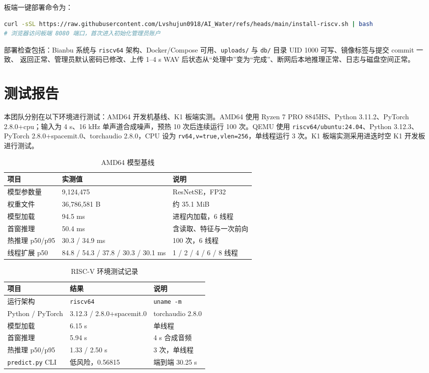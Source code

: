 \documentclass[lang=cn,11pt,scheme=chinese,chinesefont=nofont,color=green]{elegantbook}
\begin{document}
板端一键部署命令为：

\begin{lstlisting}[language=bash,caption={RISC-V 板端部署},label={lst:deploy}]
curl -sSL https://raw.githubusercontent.com/Lvshujun0918/AI_Water/refs/heads/main/install-riscv.sh | bash
# 浏览器访问板端 8080 端口，首次进入初始化管理员账户
\end{lstlisting}

部署检查包括：Bianbu 系统与 \texttt{riscv64} 架构、Docker/Compose 可用、\texttt{uploads/} 与 \texttt{db/} 目录 UID 1000 可写、镜像标签与提交 commit 一致、 返回正常、管理员默认密码已修改、上传 1--4 s WAV 后状态从“处理中”变为“完成”、断网后本地推理正常、日志与磁盘空间正常。

\section{测试报告}

本团队分别在以下环境进行测试：AMD64 开发机基线、K1 板端实测。AMD64 使用 Ryzen 7 PRO 8845HS、Python 3.11.2、PyTorch 2.8.0+cpu；输入为 4 s、16 kHz 单声道合成噪声，预热 10 次后连续运行 100 次。QEMU 使用 \texttt{riscv64/ubuntu:24.04}、Python 3.12.3、PyTorch 2.8.0+spacemit.0、torchaudio 2.8.0，CPU 设为 \texttt{rv64,v=true,vlen=256}，单线程运行 3 次。K1 板端实测采用进迭时空 K1 开发板进行测试。

\begin{table}[htbp]
\centering
\small
\caption{AMD64 模型基线}
\label{tab:amd64}
\begin{tabular}{p{3.4cm}p{3.6cm}p{6.2cm}}
\toprule
项目 & 实测值 & 说明 \\
\midrule
模型参数量 & 9,124,475 & ResNetSE，FP32 \\
权重文件 & 36,786,581 B & 约 35.1 MiB \\
模型加载 & 94.5 ms & 进程内加载，6 线程 \\
首窗推理 & 50.4 ms & 含读取、特征与一次前向 \\
热推理 p50/p95 & 30.3 / 34.9 ms & 100 次，6 线程 \\
线程扩展 p50 & 84.8 / 54.3 / 37.8 / 30.3 / 30.1 ms & 1 / 2 / 4 / 6 / 8 线程 \\
\bottomrule
\end{tabular}
\end{table}

\begin{table}[htbp]
\centering
\small
\caption{RISC-V 环境测试记录}
\label{tab:qemu}
\begin{tabular}{p{3.2cm}p{4.8cm}p{5.2cm}}
\toprule
项目 & 结果 & 说明 \\
\midrule
运行架构 & \texttt{riscv64} & \texttt{uname -m} \\
Python / PyTorch & 3.12.3 / 2.8.0+spacemit.0 & torchaudio 2.8.0 \\
模型加载 & 6.15 s & 单线程 \\
首窗推理 & 5.94 s & 4 s 合成音频 \\
热推理 p50/p95 & 1.33 / 2.50 s & 3 次，单线程 \\
\texttt{predict.py} CLI & 低风险，0.56815 & 端到端 30.25 s \\
\bottomrule
\end{tabular}
\end{table}
\end{document}
